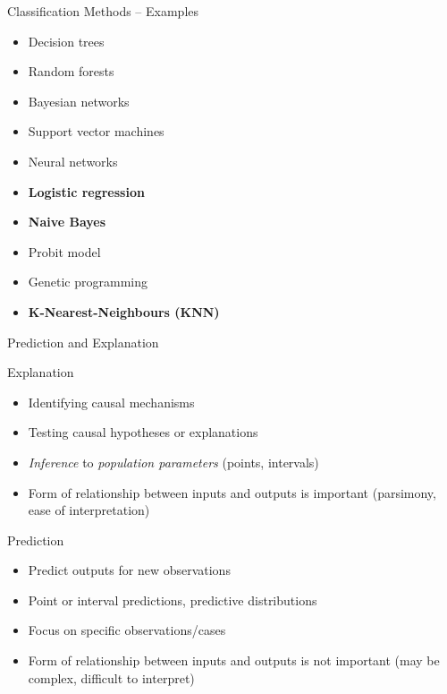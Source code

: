 \documentclass[ignorenonframetext,xcolor=x11names]{beamer}
\begin{document}
\begin{frame}{Classification Methods -- Examples}
\begin{itemize}
   \item Decision trees
   \item Random forests
   \item Bayesian networks
   \item Support vector machines
   \item Neural networks
   \item \textbf{Logistic regression}
   \item \textbf{Naive Bayes}
   \item Probit model
   \item Genetic programming
   \item \textbf{K-Nearest-Neighbours (KNN)}
\end{itemize}
\end{frame}

\begin{frame}{Prediction and Explanation}
\begin{block}{Explanation}
  \begin{itemize}
     \item Identifying causal mechanisms
     \item Testing causal hypotheses or explanations
     \item \emph{Inference} to \emph{population parameters} (points, intervals)
     \item Form of relationship between inputs and outputs is important (parsimony, ease of interpretation)
  \end{itemize}
\end{block}

\begin{block}{Prediction}
  \begin{itemize}
     \item Predict outputs for new observations
     \item Point or interval predictions, predictive distributions
     \item Focus on specific observations/cases
     \item Form of relationship between inputs and outputs is not important (may be complex, difficult to interpret)
  \end{itemize}
\end{block}
\end{frame}
\end{document}
